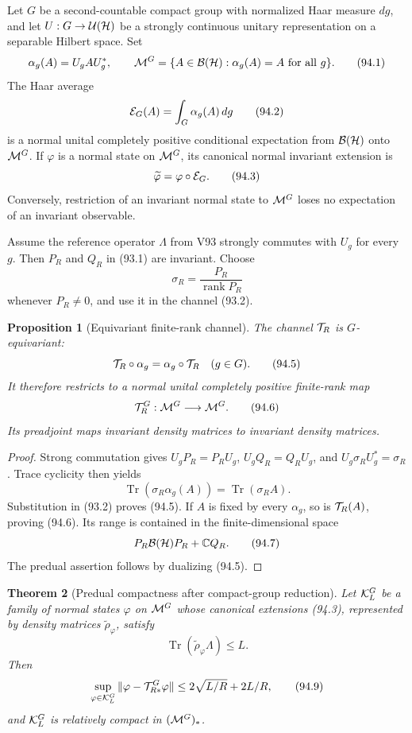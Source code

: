 \documentclass[11pt]{article}
\newtheorem{theorem}{Theorem}[section]
\newtheorem{proposition}[theorem]{Proposition}
\theoremstyle{remark}
\begin{document}
Let \(G\) be a second-countable compact group with normalized Haar
measure \(dg\), and let \(U:G\to{\cal U}({\cal H})\) be a strongly
continuous unitary representation on a separable Hilbert space.
Set
\[
 \alpha_g(A)=U_gAU_g^*,\qquad
 {\cal M}^G=\{A\in{\cal B}({\cal H}):\alpha_g(A)=A
                    \text{ for all }g\}.                         \tag{94.1}
\]
The Haar average
\[
 {\cal E}_G(A)=\int_G\alpha_g(A)\,dg                              \tag{94.2}
\]
is a normal unital completely positive conditional expectation from
\({\cal B}({\cal H})\) onto \({\cal M}^G\).  If
\(\varphi\) is a normal state on \({\cal M}^G\), its canonical
normal invariant extension is
\[
 \widetilde\varphi=\varphi\circ{\cal E}_G.                        \tag{94.3}
\]
Conversely, restriction of an invariant normal state to
\({\cal M}^G\) loses no expectation of an invariant observable.

Assume the reference operator \(\Lambda\) from V93 strongly commutes
with \(U_g\) for every \(g\).  Then \(P_R\) and \(Q_R\) in (93.1)
are invariant.  Choose
\[
 \sigma_R=\frac{P_R}{\operatorname{rank}P_R}                     \tag{94.4}
\]
whenever \(P_R\neq0\), and use it in the channel (93.2).

\begin{proposition}[Equivariant finite-rank channel]
\label{prop:v12v94-equivariant}
The channel \({\cal T}_R\) is \(G\)-equivariant:
\[
 {\cal T}_R\circ\alpha_g=\alpha_g\circ{\cal T}_R
 \quad(g\in G).                                                   \tag{94.5}
\]
It therefore restricts to a normal unital completely positive
finite-rank map
\[
 {\cal T}_R^G:{\cal M}^G\longrightarrow{\cal M}^G.               \tag{94.6}
\]
Its preadjoint maps invariant density matrices to invariant density
matrices.
\end{proposition}

\begin{proof}
Strong commutation gives
\(U_gP_R=P_RU_g\), \(U_gQ_R=Q_RU_g\), and
\(U_g\sigma_RU_g^*=\sigma_R\).  Trace cyclicity then yields
\[
 \operatorname{Tr}(\sigma_R\alpha_g(A))
 =\operatorname{Tr}(\sigma_RA).
\]
Substitution in (93.2) proves (94.5).  If \(A\) is fixed by every
\(\alpha_g\), so is \({\cal T}_R(A)\), proving (94.6).  Its range is
contained in the finite-dimensional space
\[
 P_R{\cal B}({\cal H})P_R+\mathbb C Q_R.                         \tag{94.7}
\]
The predual assertion follows by dualizing (94.5).
\end{proof}

\begin{theorem}[Predual compactness after compact-group reduction]
\label{thm:v12v94-fixed}
Let \({\cal K}^G_L\) be a family of normal states \(\varphi\) on
\({\cal M}^G\) whose canonical extensions (94.3), represented by
density matrices \(\widetilde\rho_\varphi\), satisfy
\[
 \operatorname{Tr}(\widetilde\rho_\varphi\Lambda)\leq L.          \tag{94.8}
\]
Then
\[
 \sup_{\varphi\in{\cal K}^G_L}
 \|\varphi-{\cal T}_{R*}^G\varphi\|
 \leq2\sqrt{L/R}+2L/R,                                           \tag{94.9}
\]
and \({\cal K}^G_L\) is relatively compact in
\(({\cal M}^G)_*\).
\end{theorem}
\end{document}
